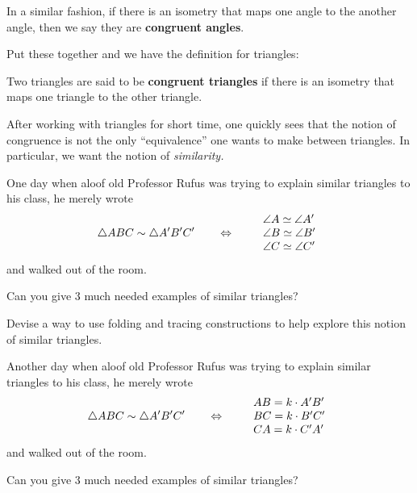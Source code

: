 \begin{dfn}
In a similar fashion, if there is an isometry that maps one angle to
the another angle, then we say they are \textbf{congruent angles}.
\end{dfn}

Put these together and we have the definition for triangles:

\begin{dfn} 
Two triangles are said to be \textbf{congruent triangles} if there is
an isometry that maps one triangle to the other triangle.
\end{dfn}


After working with triangles for short time, one quickly sees that the
notion of congruence is not the only ``equivalence'' one wants to
make between triangles. In particular, we want the notion of
\textit{similarity.} 

One day when aloof old Professor Rufus was trying to explain similar
triangles to his class, he merely wrote
\[
\triangle ABC \sim \triangle A'B'C' \qquad\Leftrightarrow \qquad\begin{array}{l}
\angle A \simeq \angle A'\\
\angle B \simeq \angle B' \\
\angle C \simeq \angle C'
\end{array}
\]
and walked out of the room.

\begin{ques} 
Can you give $3$ much needed examples of similar triangles? 
\end{ques}
\QM

\begin{ques} 
Devise a way to use folding and tracing constructions to help explore this notion
of similar triangles.
\end{ques}
\QM

Another day when aloof old Professor Rufus was trying to explain
similar triangles to his class, he merely wrote
\[
\triangle ABC \sim \triangle A'B'C' \qquad\Leftrightarrow \qquad
\begin{array}{l}
AB = k\cdot A'B'\\
BC = k\cdot B'C' \\
CA = k\cdot C'A'
\end{array}
\]
and walked out of the room.

\begin{ques} 
Can you give $3$ much needed examples of similar triangles? 
\end{ques}
\QM

